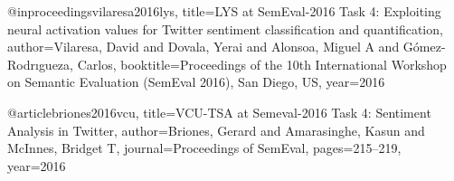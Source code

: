 \documentclass[runningheads,a4paper]{llncs}
\begin{document}
@inproceedings{vilaresa2016lys,
  title={LYS at SemEval-2016 Task 4: Exploiting neural activation values for Twitter sentiment classification and quantification},
  author={Vilaresa, David and Dovala, Yerai and Alonsoa, Miguel A and G{\'o}mez-Rodr{\i}gueza, Carlos},
  booktitle={Proceedings of the 10th International Workshop on Semantic Evaluation (SemEval 2016), San Diego, US},
  year={2016}
}

@article{briones2016vcu,
  title={VCU-TSA at Semeval-2016 Task 4: Sentiment Analysis in Twitter},
  author={Briones, Gerard and Amarasinghe, Kasun and McInnes, Bridget T},
  journal={Proceedings of SemEval},
  pages={215--219},
  year={2016}
}
\end{document}

